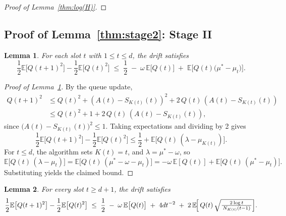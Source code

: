 \documentclass[12pt,draftcls, onecolumn]{IEEEtran}
\newcommand{\vedisc}{\omega}
\newcommand{\EE}{\mathbb{E}}
\newtheorem{lemma}{Lemma}
\begin{document}
{\begin{proof}[Proof of Lemma~\ref{thm:log(H)}]
\end{proof}
\subsection{Proof of Lemma~\ref{thm:stage2}: Stage II}
\label{sec:stageII}


\begin{lemma}\label{lem:drift-t<kappa}
For each slot \(t\) with \(1 \le t \le {d}\), the drift satisfies
\[
\frac{1}{2}\EE\bigl[Q(t+1)^2\bigr]
- \frac{1}{2}\EE\bigl[Q(t)^2\bigr]
\;\le\;
\frac{1}{2}
\;-\;
\vedisc\,\EE\bigl[Q(t)\bigr]
\;+\;
\EE\bigl[Q(t)\bigl(\mu^*-\mu_t\bigr)\bigr].
\]
\end{lemma}

\begin{proof}[Proof of Lemma~\ref{lem:drift-t<kappa}]
By the queue update,
\begin{align*}
Q(t+1)^2
&\le Q(t)^2 + \left(A(t)-S_{K(t)}(t)\right)^2
+ 2\,Q(t)\,\left(A(t)-S_{K(t)}(t)\right)\\
&\le Q(t)^2 + 1 + 2\,Q(t)\,\left(A(t)-S_{K(t)}(t)\right),
\end{align*}
since \(\bigl(A(t)-S_{K(t)}(t)\bigr)^2\le1\).  Taking expectations and dividing by 2 gives
\[
\frac12\EE\bigl[Q(t+1)^2\bigr]
-\frac12\EE\bigl[Q(t)^2\bigr]
\le \frac12 + \EE\bigl[Q(t)\,(\lambda-\mu_{K(t)})\bigr].
\]
For \(t\le{d}\), the algorithm sets \(K(t)=t\), and \(\lambda=\mu^*-\vedisc\), so
\[
\EE\bigl[Q(t)\,(\lambda-\mu_t)\bigr]
= \EE\bigl[Q(t)\,(\mu^*-\vedisc-\mu_t)\bigr]
= -\vedisc\,\EE[Q(t)] + \EE\bigl[Q(t)\,(\mu^*-\mu_t)\bigr].
\]
Substituting yields the claimed bound.
\end{proof}


\begin{lemma}\label{lem:drift-t>kappa}
For every slot \(t\ge{d}+1\), the drift satisfies
\[
\frac{1}{2}\EE\bigl[Q(t+1)^2\bigr]
- \frac{1}{2}\EE\bigl[Q(t)^2\bigr]
\;\le\;
\frac{1}{2}
\;-\;
\vedisc\,\EE\bigl[Q(t)\bigr]
\;+\;
4{d} t^{-2}
\;+\;
2\,\EE\!\Bigl[\,Q(t)\,\sqrt{\tfrac{2\log t}{\,N_{K(t)}(t-1)\,}}\Bigr].
\]
\end{lemma}

}
\end{document}
